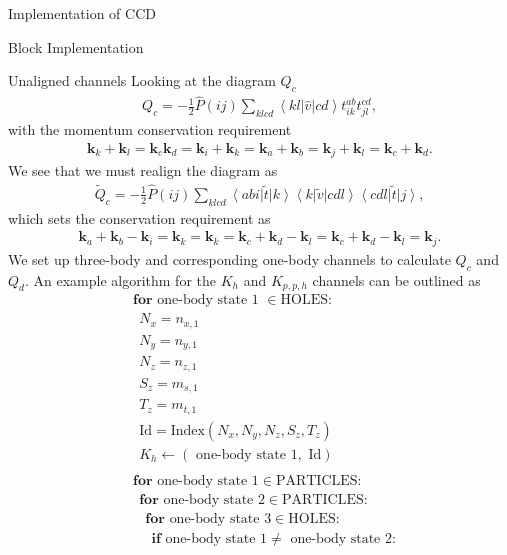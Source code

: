 \documentclass[twoside,english]{uiofysmaster}
\begin{document}
\begin{chapter}{Implementation of CCD}
\begin{section}{Block Implementation}
\begin{subsection}{Unaligned channels}
			Looking at the diagram $Q_c$
			\begin{align}
				Q_c = -\frac{1}{2} \hat P(ij) \sum_{klcd} \left<kl|\hat v|cd\right> t_{ik}^{ab} t_{jl}^{cd},
			\end{align}
			with the momentum conservation requirement
			\begin{align}
				\mathbf{k}_k + \mathbf{k}_l = \mathbf{k}_c \mathbf{k}_d = \mathbf{k}_i + \mathbf{k}_k = \mathbf{k}_a + \mathbf{k}_b = \mathbf{k}_j + \mathbf{k}_l = \mathbf{k}_c + \mathbf{k}_d.
			\end{align}
			We see that we must realign the diagram as
			\begin{align}
				\tilde Q_c = -\frac{1}{2} \hat P(ij) \sum_{klcd} \left<abi\right|\tilde t\left|k\right> \left<k\right|\tilde v\left|cdl\right> \left<cdl\right|\tilde t\left|j\right>,
			\end{align}
			which sets the conservation requirement as 
			\begin{align}
				\mathbf{k}_a + \mathbf{k}_b	- \mathbf{k}_i = \mathbf{k}_k = \mathbf{k}_k = \mathbf{k}_c + \mathbf{k}_d - \mathbf{k}_l = \mathbf{k}_c + \mathbf{k}_d - \mathbf{k}_l = \mathbf{k}_j.
			\end{align}
			We set up three-body and corresponding one-body channels to calculate $Q_c$ and $Q_d$. An example algorithm for the $K_h$ and $K_{p,p,h}$ channels can be outlined as
			\begin{align*}
				&\mathbf{for } \text{ one-body state 1 } \in \text{HOLES}:\\
				&\:\: N_x = n_{x,1}\\
				&\:\: N_y = n_{y,1}\\
				&\:\: N_z = n_{z,1}\\
 				&\:\: S_z = m_{s,1}\\
				&\:\: T_z = m_{t,1}\\
				&\:\: \text{Id} = \text{Index}(N_x,N_y,N_z,S_z,T_z) \\
				&\:\: K_h \leftarrow (\text{ one-body state 1}, \text{ Id}) \\ \\ 
				&\mathbf{for } \text{ one-body state 1} \in \text{PARTICLES}: \\
				&\:\: \mathbf{for } \text{ one-body state 2} \in \text{PARTICLES}: \\
				&\:\:\:\: \mathbf{for } \text{ one-body state 3} \in \text{HOLES}: \\
				&\:\:\:\:\:\: \mathbf{if} \text{ one-body state 1} \neq \text{ one-body state 2}: \\

\end{align*}
\end{subsection}
\end{section}
\end{chapter}
\end{document}

